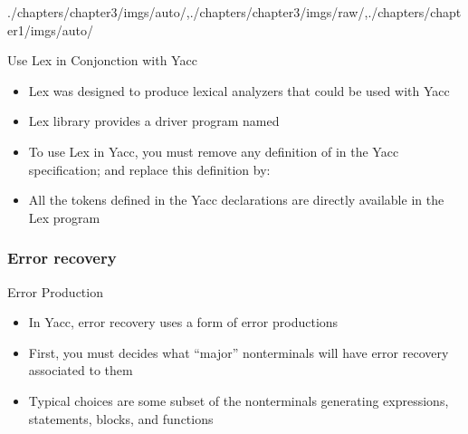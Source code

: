 \begin{graphicspathcontext}{{./chapters/chapter3/imgs/auto/},{./chapters/chapter3/imgs/raw/},{./chapters/chapter1/imgs/auto/}}
\begin{bibunit}[apalike]
\begin{frame}{{Use Lex} in Conjonction with Yacc}
	\begin{itemize}
	\item Lex was designed to produce lexical analyzers that could be used with Yacc
	\vfill
	\item Lex library provides a driver program named 
	\vfill
	\item To use Lex in Yacc, you must remove any definition of in the Yacc specification; and replace this definition by:
		\begin{center}
		\end{center}
	\vfill
	\item All the tokens defined in the Yacc declarations are directly available in the Lex program
	\end{itemize}
\end{frame}

\subsubsection{Error recovery}
\subsubsectiontableofcontentslide

\begin{frame}{Error Production}
	\begin{itemize}
	\item In Yacc, error recovery uses a form of error productions
	\item First, you must decides what ``major'' nonterminals will have error recovery associated to them
	\item Typical choices are some subset of the nonterminals generating expressions, statements, blocks, and functions
	\end{itemize}
\end{frame}


\end{bibunit}
\end{graphicspathcontext}
